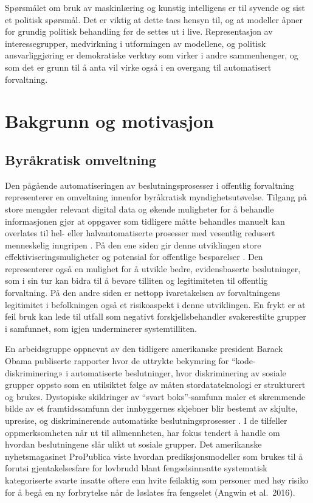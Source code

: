 \documentclass[
]{book}
\begin{document}
Spørsmålet om bruk av maskinlæring og kunstig intelligens er til syvende og sist et politisk spørsmål.
Det er viktig at dette taes hensyn til, og at modeller åpner for grundig politisk behandling før de settes ut i live.
Representasjon av interessegrupper, medvirkning i utformingen av modellene, og politisk ansvarliggjøring er demokratiske verktøy som virker i andre sammenhenger, og som det er grunn til å anta vil virke også i en overgang til automatisert forvaltning.

\hypertarget{bakgrunn}{%
\chapter{Bakgrunn og motivasjon}\label{bakgrunn}}

\hypertarget{byruxe5kratisk-omveltning}{%
\section{Byråkratisk omveltning}\label{byruxe5kratisk-omveltning}}

Den pågående automatiseringen av beslutningsprosesser i offentlig forvaltning representerer en omveltning innenfor byråkratisk myndighetsutøvelse.
Tilgang på store mengder relevant digital data og økende muligheter for å behandle informasjonen gjør at oppgaver som tidligere måtte behandles manuelt kan overlates til hel- eller halvautomatiserte prosesser med vesentlig redusert menneskelig inngripen \citep{zarsky2016trouble}.
På den ene siden gir denne utviklingen store effektiviseringsmuligheter og potensial for offentlige besparelser \citep{duwe2017effects}.
Den representerer også en mulighet for å utvikle bedre, evidensbaserte beslutninger, som i sin tur kan bidra til å bevare tilliten og legitimiteten til offentlig forvaltning.
På den andre siden er nettopp ivaretakelsen av forvaltningens legitimitet i befolkningen også et risikoaspekt i denne utviklingen.
En frykt er at feil bruk kan lede til utfall som negativt forskjellsbehandler svakerestilte grupper i samfunnet, som igjen underminerer systemtilliten.

En arbeidsgruppe oppnevnt av den tidligere amerikanske president Barack Obama publiserte rapporter hvor de uttrykte bekymring for ``kode-diskriminering» i automatiserte beslutninger, hvor diskriminering av sosiale grupper oppsto som en utilsiktet følge av måten stordatateknologi er strukturert og brukes.
Dystopiske skildringer av ``svart boks''-samfunn maler et skremmende bilde av et framtidssamfunn der innbyggernes skjebner blir bestemt av skjulte, upresise, og diskriminerende automatiske beslutningsprosesser \citep{barocas2016big, pasquale2015black}.
I de tilfeller oppmerksomheten når ut til allmennheten, har fokus tendert å handle om hvordan beslutningene slår ulikt ut sosiale grupper.
Det amerikanske nyhetsmagasinet ProPublica viste hvordan prediksjonsmodeller som brukes til å forutsi gjentakelsesfare for lovbrudd blant fengselsinnsatte systematisk kategoriserte svarte insatte oftere enn hvite feilaktig som personer med høy risiko for å begå en ny forbrytelse når de løslates fra fengselet (Angwin et al.~2016).
\end{document}
